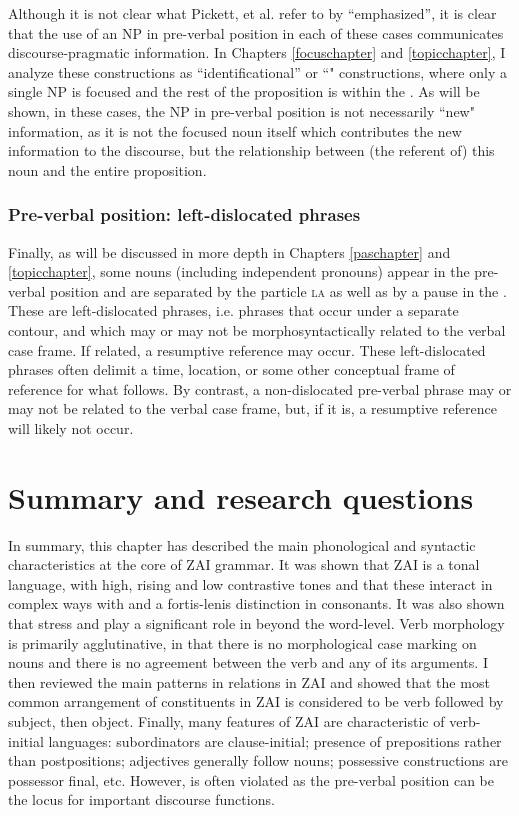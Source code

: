 Although it is not clear what Pickett, et al. refer to by ``emphasized'', it is clear that the use of an NP in pre-verbal position in each of these cases communicates discourse-pragmatic information. In Chapters \ref{focuschapter} and \ref{topicchapter}, I analyze these constructions as ``identificational'' or ``" constructions, where only a single NP is focused and the rest of the proposition is within the  \citep[228--233]{lambrecht1994}. As will be shown, in these cases, the NP in pre-verbal position is not necessarily ``new" information, as it is not the focused noun itself which contributes the new information to the discourse, but the relationship between (the referent of) this noun and the entire proposition.  


\subsubsection{Pre-verbal position: left-dislocated phrases}
Finally, as will be discussed in more depth in Chapters \ref{paschapter} and \ref{topicchapter}, some nouns (including independent pronouns) appear in the pre-verbal position and are separated by the particle \textsc{la} as well as by a pause in the . These are left-dislocated phrases, i.e. phrases that occur under a separate  contour, and which may or may not be morphosyntactically related to the verbal case frame. If related, a resumptive reference may occur. These left-dislocated phrases often delimit a time, location, or some other conceptual frame of reference for what follows. By contrast, a non-dislocated pre-verbal phrase may or may not be related to the verbal case frame, but, if it is, a resumptive reference will likely not occur. 


\section{Summary and research questions}

In summary, this chapter has described the main phonological and syntactic characteristics at the core of ZAI grammar. It was shown that ZAI is a tonal language, with high, rising and low contrastive tones and that these interact in complex ways with  and a fortis-lenis distinction in consonants. It was also shown that stress and  play a significant role in  beyond the word-level. Verb morphology is primarily agglutinative, in that there is no morphological case marking on nouns and there is no agreement between the verb and any of its arguments. I then reviewed the main patterns in  relations in ZAI and showed that the most common arrangement of constituents in ZAI is considered to be verb followed by subject, then object. Finally, many features of ZAI are characteristic of verb-initial languages:  subordinators are clause-initial; presence of prepositions rather than postpositions; adjectives generally follow nouns; possessive constructions are possessor final, etc. However,  is often violated as the pre-verbal position can be the locus for important discourse functions.

